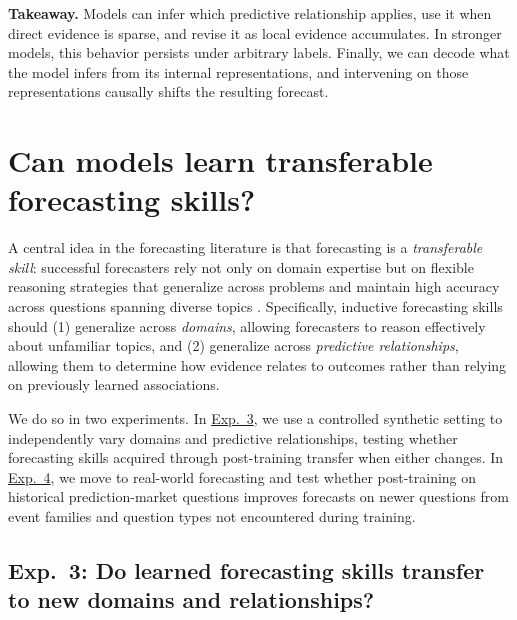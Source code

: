 \documentclass{article}
\begin{document}
\noindent\textbf{Takeaway.}
Models can infer which predictive relationship applies, use it when direct evidence is sparse, and revise it as local evidence accumulates.
In stronger models, this behavior persists under arbitrary labels.
Finally, we can decode what the model infers from its internal representations, and intervening on those representations causally shifts the resulting forecast.


\section{Can models learn transferable forecasting skills?}
\label{sec:transfer}

A central idea in the forecasting literature is that forecasting is a \textit{transferable skill}: successful forecasters rely not only on domain expertise but on flexible reasoning strategies that generalize across problems and maintain high accuracy across questions spanning diverse topics \citep{tetlock2005expert,mellers2015identifying}.
Specifically, inductive forecasting skills should (1) generalize across \textit{domains}, allowing forecasters to reason effectively about unfamiliar topics, and (2) generalize across \textit{predictive relationships}, allowing them to determine how evidence relates to outcomes rather than relying on previously learned associations.

We do so in two experiments.
In \hyperref[sec:exp3]{Exp.~3}, we use a controlled synthetic setting to independently vary domains and predictive relationships, testing whether forecasting skills acquired through post-training transfer when either changes.
In \hyperref[sec:exp4]{Exp.~4}, we move to real-world forecasting and test whether post-training on historical prediction-market questions improves forecasts on newer questions from event families and question types not encountered during training.

\subsection{Exp.~3: Do learned forecasting skills transfer to new domains and relationships?}
\label{sec:exp3}
\end{document}
